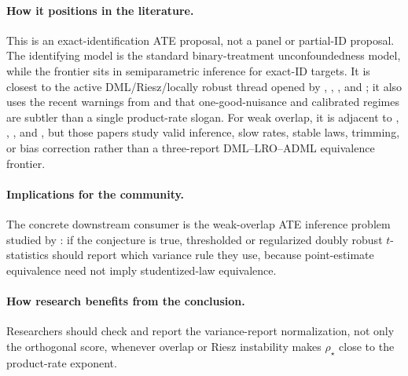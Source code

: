 \documentclass[11pt]{article}
\theoremstyle{definition}
\theoremstyle{plain}
\theoremstyle{remark}
\begin{document}
\paragraph{How it positions in the literature.}
This is an exact-identification ATE proposal, not a panel or partial-ID
proposal.  The identifying model is the standard binary-treatment
unconfoundedness model, while the frontier sits in semiparametric inference
for exact-ID targets.  It is closest to the active DML/Riesz/locally robust
thread opened by \citet{ChernozhukovEtAl2018ECTJ},
\citet{ChernozhukovEscancianoIchimuraNeweyRobins2022LRO},
\citet{ChernozhukovNeweySingh2022ADML}, and
\citet{ChernozhukovNeweySingh2022RR}; it also uses the recent warnings from
\citet{DukesVansteelandtWhitney2024JMLR} and
\citet{VanDerLaanLuedtkeCarone2024CDML} that one-good-nuisance and
calibrated regimes are subtler than a single product-rate slogan.  For weak
overlap, it is adjacent to \citet{Rothe2017LimitedOverlapCI},
\citet{HongLeungLi2020LimitedOverlap}, \citet{HeilerKazak2021ExtremePS}, and
\citet{MaSantAnnaSasakiUra2026WeakOverlapDR}, but those papers study valid
inference, slow rates, stable laws, trimming, or bias correction rather than a
three-report DML--LRO--ADML equivalence frontier.

\paragraph{Implications for the community.}
The concrete downstream consumer is the weak-overlap ATE inference problem
studied by \citet{Dorn2025WeakOverlapDR}: if the conjecture is true, thresholded
or regularized doubly robust \(t\)-statistics should report which variance
rule they use, because point-estimate equivalence need not imply
studentized-law equivalence.

\paragraph{How research benefits from the conclusion.}
Researchers should check and report the variance-report normalization, not
only the orthogonal score, whenever overlap or Riesz instability makes
\(\rho_\star\) close to the product-rate exponent.
\end{document}
